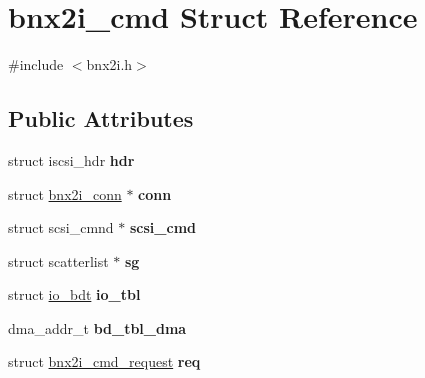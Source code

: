 \hypertarget{structbnx2i__cmd}{
\section{bnx2i\_\-cmd Struct Reference}
\label{structbnx2i__cmd}
}


{\ttfamily \#include $<$bnx2i.h$>$}

\subsection*{Public Attributes}
\begin{DoxyCompactItemize}
\item 
\hypertarget{structbnx2i__cmd_a4d67dca30b1c8c466ce406c123b5588c}{
struct iscsi\_\-hdr {\bfseries hdr}}
\label{structbnx2i__cmd_a4d67dca30b1c8c466ce406c123b5588c}

\item 
\hypertarget{structbnx2i__cmd_af5b52492e5c7accb8874ffab1778e07a}{
struct \hyperlink{structbnx2i__conn}{bnx2i\_\-conn} $\ast$ {\bfseries conn}}
\label{structbnx2i__cmd_af5b52492e5c7accb8874ffab1778e07a}

\item 
\hypertarget{structbnx2i__cmd_a856fee606419da1d739c438509ab42cc}{
struct scsi\_\-cmnd $\ast$ {\bfseries scsi\_\-cmd}}
\label{structbnx2i__cmd_a856fee606419da1d739c438509ab42cc}

\item 
\hypertarget{structbnx2i__cmd_a252c38c5640b118d3b195a21e601d03a}{
struct scatterlist $\ast$ {\bfseries sg}}
\label{structbnx2i__cmd_a252c38c5640b118d3b195a21e601d03a}

\item 
\hypertarget{structbnx2i__cmd_afa65e956f4b352973aa3c9bf81734b8f}{
struct \hyperlink{structio__bdt}{io\_\-bdt} {\bfseries io\_\-tbl}}
\label{structbnx2i__cmd_afa65e956f4b352973aa3c9bf81734b8f}

\item 
\hypertarget{structbnx2i__cmd_a71cd815672b73598ad3fd027c8aa50ee}{
dma\_\-addr\_\-t {\bfseries bd\_\-tbl\_\-dma}}
\label{structbnx2i__cmd_a71cd815672b73598ad3fd027c8aa50ee}

\item 
\hypertarget{structbnx2i__cmd_a060a4c80aa58078fb23cdec40de769df}{
struct \hyperlink{structbnx2i__cmd__request}{bnx2i\_\-cmd\_\-request} {\bfseries req}}
\label{structbnx2i__cmd_a060a4c80aa58078fb23cdec40de769df}

\end{DoxyCompactItemize}


